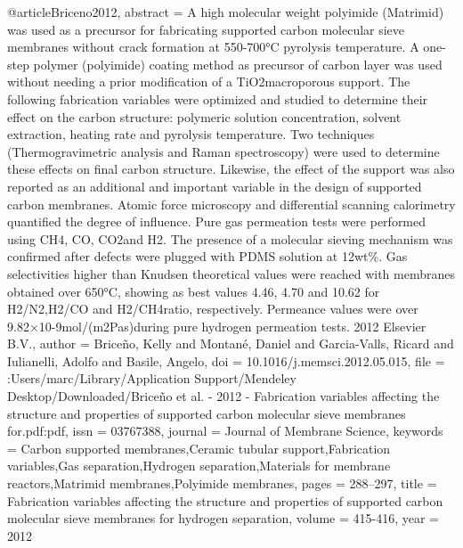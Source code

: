 @article{Briceno2012,
abstract = {A high molecular weight polyimide (Matrimid) was used as a precursor for fabricating supported carbon molecular sieve membranes without crack formation at 550-700°C pyrolysis temperature. A one-step polymer (polyimide) coating method as precursor of carbon layer was used without needing a prior modification of a TiO2macroporous support. The following fabrication variables were optimized and studied to determine their effect on the carbon structure: polymeric solution concentration, solvent extraction, heating rate and pyrolysis temperature. Two techniques (Thermogravimetric analysis and Raman spectroscopy) were used to determine these effects on final carbon structure. Likewise, the effect of the support was also reported as an additional and important variable in the design of supported carbon membranes. Atomic force microscopy and differential scanning calorimetry quantified the degree of influence. Pure gas permeation tests were performed using CH4, CO, CO2and H2. The presence of a molecular sieving mechanism was confirmed after defects were plugged with PDMS solution at 12wt{\%}. Gas selectivities higher than Knudsen theoretical values were reached with membranes obtained over 650°C, showing as best values 4.46, 4.70 and 10.62 for H2/N2,H2/CO and H2/CH4ratio, respectively. Permeance values were over 9.82×10-9mol/(m2Pas)during pure hydrogen permeation tests. {\textcopyright} 2012 Elsevier B.V.},
author = {Brice{\~{n}}o, Kelly and Montan{\'{e}}, Daniel and Garcia-Valls, Ricard and Iulianelli, Adolfo and Basile, Angelo},
doi = {10.1016/j.memsci.2012.05.015},
file = {:Users/marc/Library/Application Support/Mendeley Desktop/Downloaded/Brice{\~{n}}o et al. - 2012 - Fabrication variables affecting the structure and properties of supported carbon molecular sieve membranes for.pdf:pdf},
issn = {03767388},
journal = {Journal of Membrane Science},
keywords = {Carbon supported membranes,Ceramic tubular support,Fabrication variables,Gas separation,Hydrogen separation,Materials for membrane reactors,Matrimid membranes,Polyimide membranes},
pages = {288--297},
title = {{Fabrication variables affecting the structure and properties of supported carbon molecular sieve membranes for hydrogen separation}},
volume = {415-416},
year = {2012}
}
